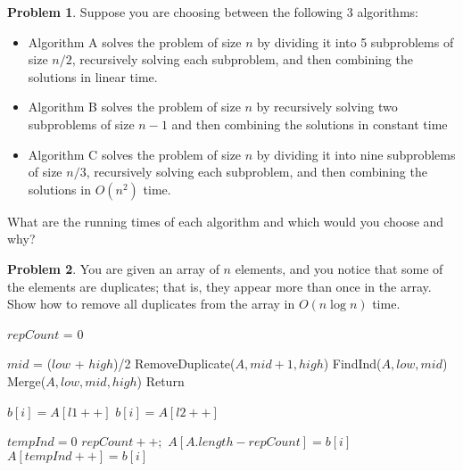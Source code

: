 \documentclass{article}
\theoremstyle{definition}
\newtheorem{Q}{Problem}
\begin{document}
\pagebreak

\begin{Q}
Suppose you are choosing between the following 3 algorithms:
\begin{itemize}
\item Algorithm A solves the problem of size $n$ by dividing it into 5 subproblems of size $n/2$, recursively solving each subproblem, and then combining the solutions in linear time.
\item Algorithm B solves the problem of size $n$ by recursively solving two subproblems of size $n-1$ and then combining the solutions in constant time
\item Algorithm C solves the problem of size $n$ by dividing it into nine subproblems of size $n/3$, recursively solving each subproblem, and then combining the solutions in $O(n^2)$ time.
\end{itemize}
What are the running times of each algorithm and which would you choose and why?
\end{Q}
\pagebreak
\begin{Q}
You are given an array of $n$ elements, and you notice that some of the elements are duplicates; that is, they appear more than once in the array. Show how to remove all duplicates from the array in $O(n \log n)$ time.



\begin{algorithm}
\caption{}\label{}
\begin{algorithmic}
\State $repCount$ = 0


    \State $mid$ =  ($low$ + $high$)/2
    \State RemoveDuplicate($A,mid+1,high$)
    \State FindInd($A,low,mid$)
    \State Merge($A,low,mid,high$)
    \Else
        \State Return
    \EndIf

    


\EndProcedure
\linebreak
{}


      \State {}
            \State
                $b[i]=A[l1++]$
                \EndIf
            \State
                $b[i]=A[l2++]$
                \EndIf
                
      \EndFor
\State $tempInd=0$
  \State $repCount++;$
   \State $A[A.length-repCount] = b[i]$
    \Else
        \State $A[tempInd++] = b[i]$
       \EndIf
    \EndFor


\EndProcedure
\end{algorithmic}
\end{algorithm}




\end{Q}
\end{document}
